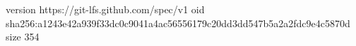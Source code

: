 version https://git-lfs.github.com/spec/v1
oid sha256:a1243e42a939f33dc0c9041a4ac56556179c20dd3dd547b5a2a2fdc9e4c5870d
size 354
